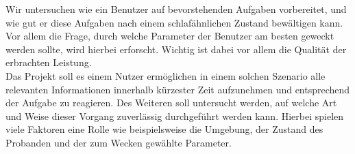 Wir untersuchen wie ein Benutzer auf bevorstehenden Aufgaben vorbereitet, und wie gut er diese Aufgaben nach einem schlafähnlichen Zustand bewältigen kann. 
Vor allem die Frage, durch welche Parameter der Benutzer am besten geweckt werden sollte, wird hierbei erforscht. Wichtig ist dabei vor allem die Qualität der erbrachten Leistung.\\
Das Projekt \projectName soll es einem Nutzer ermöglichen in einem solchen Szenario alle relevanten Informationen innerhalb kürzester Zeit aufzunehmen und entsprechend der Aufgabe zu reagieren. Des Weiteren soll untersucht werden, auf welche Art und Weise dieser Vorgang zuverlässig durchgeführt werden kann. Hierbei spielen viele Faktoren eine Rolle wie beispielsweise die Umgebung, der Zustand des Probanden und der zum Wecken gewählte Parameter.
